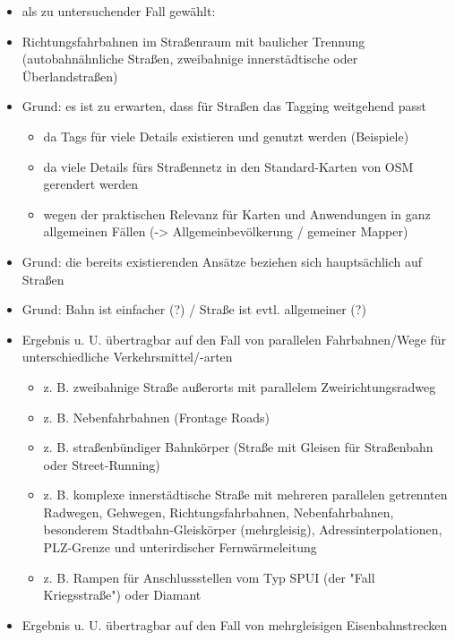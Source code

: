 \documentclass[../main/thesis.tex]{subfiles}
\begin{document}
\begin{itemize}
	
	
	\item als zu untersuchender Fall gewählt:
	
	\item Richtungsfahrbahnen im Straßenraum mit baulicher Trennung
		(autobahnähnliche Straßen, zweibahnige innerstädtische oder Überlandstraßen)
	
	\item Grund: es ist zu erwarten, dass für Straßen das Tagging weitgehend passt
	\begin{itemize}
		\item da Tags für viele Details existieren und genutzt werden (Beispiele)
		\item da viele Details fürs Straßennetz in den Standard-Karten von OSM gerendert werden
		\item wegen der praktischen Relevanz für Karten und Anwendungen in ganz allgemeinen Fällen
			(-> Allgemeinbevölkerung / gemeiner Mapper)
	\end{itemize}
	\item Grund: die bereits existierenden Ansätze beziehen sich hauptsächlich auf Straßen
	\item Grund: Bahn ist einfacher (?) / Straße ist evtl. allgemeiner (?)
	
	
	\item Ergebnis u. U. übertragbar auf den Fall von parallelen Fahrbahnen/Wege für unterschiedliche Verkehrsmittel/-arten
	\begin{itemize}
		\item z. B. zweibahnige Straße außerorts mit parallelem Zweirichtungsradweg
		\item z. B. Nebenfahrbahnen (Frontage Roads)
		\item z. B. straßenbündiger Bahnkörper (Straße mit Gleisen für Straßenbahn oder Street-Running)
		\item z. B. komplexe innerstädtische Straße mit mehreren parallelen getrennten Radwegen, Gehwegen, Richtungsfahrbahnen, Nebenfahrbahnen, besonderem Stadtbahn-Gleiskörper (mehrgleisig), Adressinterpolationen, PLZ-Grenze und unterirdischer Fernwärmeleitung
		\item z. B. Rampen für Anschlussstellen vom Typ SPUI (der "Fall Kriegsstraße") oder Diamant
	\end{itemize}
	
	\item Ergebnis u. U. übertragbar auf den Fall von mehrgleisigen Eisenbahnstrecken
	
\end{itemize}



\onlyinsubfile{\nocite{*}}  %
\onlyinsubfile{ {}}
\end{document}
